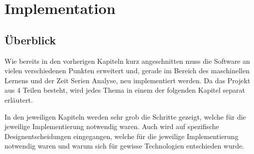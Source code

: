 \chapter{Implementation}
\label{cha:Implementation}


\section{Überblick}

Wie bereits in den vorherigen Kapiteln kurz angeschnitten muss die Software an vielen verschiedenen Punkten erweitert und, gerade im Bereich des maschinellen Lernens und der Zeit Serien Analyse, neu implementiert werden.
Da das Projekt aus 4 Teilen besteht, wird jedes Thema in einem der folgenden Kapitel separat erläutert.

In den jeweiligen Kapiteln werden sehr grob die Schritte gezeigt, welche für die jeweilige Implementierung notwendig waren. 
Auch wird auf spezifische Designentscheidungen eingegangen, welche für die jeweilige Implementierung notwendig waren und warum sich für gewisse Technologien entschieden wurde.


